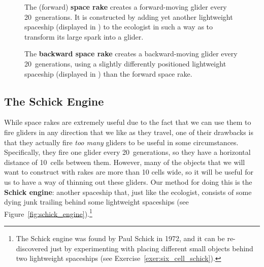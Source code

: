 \begin{figure}[!htb]
	\centering{}
	\caption{The (forward) \textbf{space rake} creates a forward-moving glider every 20~generations. It is constructed by adding yet another lightweight spaceship (displayed in ) to the ecologist in such a way as to transform its large spark into a glider.}\label{fig:space_rake}
\end{figure}

\begin{figure}[!htb]
	\centering{}
	\caption{The \textbf{backward space rake} creates a backward-moving glider every 20~generations, using a slightly differently positioned lightweight spaceship (displayed in ) than the forward space rake.}\label{fig:back_space_rake}
\end{figure}


\subsection{The Schick Engine}\label{sec:schick_engine}

While space rakes are extremely useful due to the fact that we can use them to fire gliders in any direction that we like as they travel, one of their drawbacks is that they actually fire \emph{too many} gliders to be useful in some circumstances. Specifically, they fire one glider every 20~generations, so they have a horizontal distance of 10~cells between them. However, many of the objects that we will want to construct with rakes are more than 10 cells wide, so it will be useful for us to have a way of thinning out these gliders. Our method for doing this is the \textbf{Schick engine}: another spaceship that, just like the ecologist, consists of some dying junk trailing behind some lightweight spaceships (see Figure~\ref{fig:schick_engine}).\footnote{The Schick engine was found by Paul Schick in 1972, and it can be re-discovered just by experimenting with placing different small objects behind two lightweight spaceships (see Exercise~\ref{exer:six_cell_schick}).}

